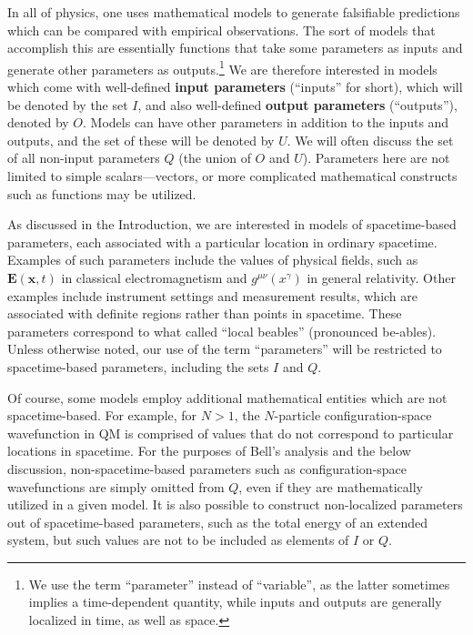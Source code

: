 \documentclass[onecolumn, nofootinbib, 12pt]{revtex4-1}
\begin{document}
In all of physics, one uses mathematical models to generate falsifiable predictions which can be compared with empirical observations.  The sort of models that accomplish this are essentially functions that take some parameters as inputs and generate other parameters as outputs.\footnote{We use the term ``parameter'' instead of ``variable'', as the latter sometimes implies a time-dependent quantity, while inputs and outputs are generally localized in time, as well as space.}
We are therefore interested in models which come with well-defined {\bf input parameters} (``inputs'' for short), which will be denoted by the set $I$, and also well-defined {\bf output parameters} (``outputs''), denoted by $O$.  Models can have other parameters in addition to the inputs and outputs, and the set of these will be denoted by $U$.  We will often discuss the set of all non-input parameters $Q$ (the union of $O$ and $U$).  Parameters here are not limited to simple scalars---vectors, or more complicated mathematical constructs such as functions may be utilized.

As discussed in the Introduction, we are interested in models of spacetime-based parameters, each associated with a particular location in ordinary spacetime.  Examples of such parameters include the values of physical fields, such as $\bm{E}(\bm{x},t)$ in classical electromagnetism and $g^{\mu\nu}(x^\gamma)$ in general relativity.  Other examples include instrument settings and measurement results, which are associated with definite regions rather than points in spacetime.  These parameters correspond to what \textcite{bell1976b} called ``local beables'' (pronounced be-ables).  Unless otherwise noted, our use of the term ``parameters'' will be restricted to spacetime-based parameters, including the sets $I$ and $Q$.

Of course, some models employ additional mathematical entities which are not spacetime-based.  For example, for $N>1$, the $N$-particle configuration-space wavefunction in QM is comprised of values that do not correspond to particular locations in spacetime.  For the purposes of Bell's analysis and the below discussion, non-spacetime-based parameters such as configuration-space wavefunctions are simply omitted from $Q$, even if they are mathematically utilized in a given model.  It is also possible to construct non-localized parameters out of spacetime-based parameters, such as the total energy of an extended system, but such values are not to be included as elements of $I$ or $Q$.
\end{document}
